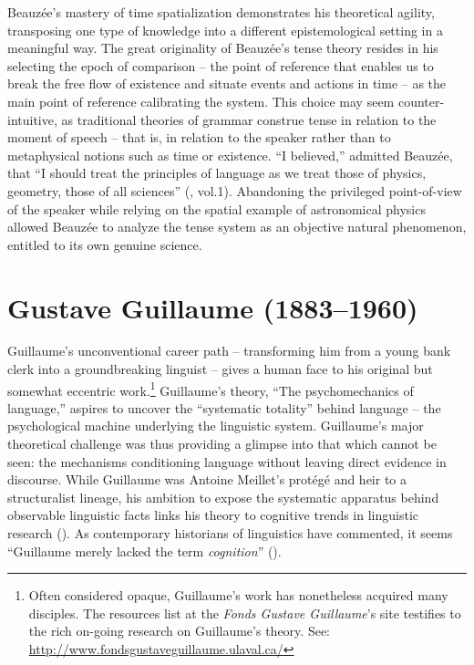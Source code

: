 \documentclass[output=paper]{langsci/langscibook}
\begin{document}
Beauzée’s mastery of time spatialization demonstrates his theoretical agility, transposing one type of knowledge into a different epistemological setting in a meaningful way. The great originality of Beauzée’s tense theory resides in his selecting the epoch of comparison -- the point of reference that enables us to break the free flow of existence and situate events and actions in time -- as the main point of reference calibrating the system. This choice may seem counter-intuitive, as traditional theories of grammar construe tense in relation to the moment of speech -- that is, in relation to the speaker rather than to metaphysical notions such as time or existence. “I believed,” admitted Beauzée, that “I should treat the principles of language as we treat those of physics, geometry, those of all sciences” (\citeyear[xvi]{beauzee_grammaire_1767}, vol.1). Abandoning the privileged point-of-view of the speaker while relying on the spatial example of astronomical physics allowed Beauzée to analyze the tense system as an objective natural phenomenon, entitled to its own genuine science.

\section{Gustave Guillaume (1883–1960)}

Guillaume’s unconventional career path -- transforming him from a young bank clerk into a groundbreaking linguist \citep{valin_histoire_1982} -- gives a human face to his original but somewhat eccentric work.\footnote{Often considered opaque, Guillaume’s work has nonetheless acquired many disciples. The resources list at the \textit{Fonds Gustave Guillaume}’s site testifies to the rich on-going research on Guillaume’s theory. See: \url{http://www.fondsgustaveguillaume.ulaval.ca/}}  Guillaume’s theory, “The psychomechanics of language,” aspires to uncover the “systematic totality” \citep[15]{guillaume_larchitectonique_1965} behind language -- the psychological machine underlying the linguistic system. Guillaume’s major theoretical challenge was thus providing a glimpse into that which cannot be seen: the mechanisms conditioning language without leaving direct evidence in discourse. While Guillaume was Antoine Meillet’s protégé and heir to a structuralist lineage, his ambition to expose the systematic apparatus behind observable linguistic facts links his theory to cognitive trends in linguistic research (\citealt{puech_mentalisme_1997}). As contemporary historians of linguistics have commented, it seems “Guillaume merely lacked the term \textit{cognition}” (\citealt[41]{bottineau_terminologie_2006}). 
\end{document}
